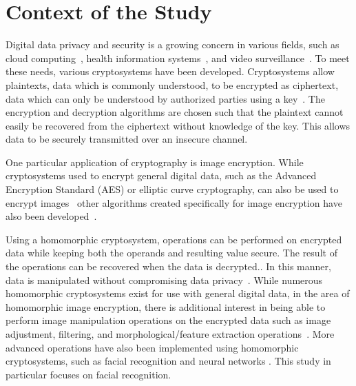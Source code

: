 
\section{Context of the Study}

Digital data privacy and security is a growing concern in various fields, such as cloud computing~\cite{potey_homomorphic_2016}, health information systems~\cite{kester_cryptographic_2015}, and video surveillance~\cite{upmanyu_efficient_2009}. To meet these needs, various cryptosystems have been developed. Cryptosystems allow plaintexts, data which is commonly understood, to be encrypted as ciphertext, data which can only be understood by authorized parties using a key~\cite{bauer_cryptosystem_2005}. The encryption and decryption algorithms are chosen such that the plaintext cannot easily be recovered from the ciphertext without knowledge of the key. This allows data to be securely transmitted over an insecure channel.

One particular application of cryptography is image encryption. While cryptosystems used to encrypt general digital data, such as the Advanced Encryption Standard (AES) or elliptic curve cryptography, can also be used to encrypt images~\cite{jain_image_2016, singh_image_2015} other algorithms created specifically for image encryption have also been developed~\cite{murugan_survey_2018}.

 Using a homomorphic cryptosystem, operations can be performed on encrypted data while keeping both the operands and resulting value secure. The result of the operations can be recovered when the data is decrypted.. In this manner, data is manipulated without compromising data privacy~\cite{fontaine_survey_2007, sen_homomorphic_2013}. While numerous homomorphic cryptosystems exist for use with general digital data, in the area of homomorphic image encryption, there is additional interest in being able to perform image manipulation operations on the encrypted data such as image adjustment, filtering, and morphological/feature extraction operations~\cite{ziad_cryptoimg:_2016, gonzalez_digital_2008}. More advanced operations have also been implemented using homomorphic cryptosystems, such as facial recognition \cite{hutchison_privacy-preserving_2009} and neural networks \cite{hesamifard_cryptodl:_2017}. This study in particular focuses on facial recognition.
